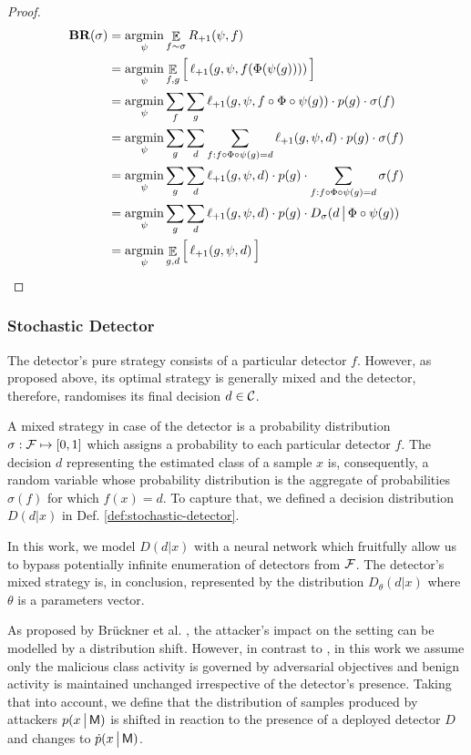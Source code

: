 \begin{proof}
    \begin{align}
        \textbf{BR}(\sigma) &= \mathop{\text{argmin}}_\psi \mathop{\mathbb{E}}_{f \sim \sigma} R_{{\text{+}1}}(\psi, f) \\
            &= \mathop{\text{argmin}}_\psi \mathop{\mathbb{E}}_{f, g} \Big[\, \ell_{{\text{+}1}} (g, \psi, f(\Phi(\psi(g)))) \,\Big] \\
            &= \mathop{\text{argmin}}_\psi \sum_f \sum_g  \ell_{{\text{+}1}} (g, \psi, f \circ \Phi \circ \psi(g))  \cdot  p(g) \cdot  \sigma(f)  \\
            &= \mathop{\text{argmin}}_\psi \sum_g \sum_d \sum_{f: f \circ \Phi \circ \psi(g) = d}  \ell_{{\text{+}1}} (g, \psi, d) \cdot  p(g) \cdot \sigma(f) \\
            &= \mathop{\text{argmin}}_\psi \sum_g \sum_d \ell_{{\text{+}1}} (g, \psi, d)  \cdot   p(g)  \cdot  \sum_{f: f \circ \Phi \circ \psi(g) = d} \sigma(f) \\
            &= \mathop{\text{argmin}}_\psi \sum_g \sum_d \ell_{{\text{+}1}} (g, \psi, d) \cdot  p(g)  \cdot D_\sigma(d \,\big|\, \Phi \circ \psi(g) ) \\
            &= \mathop{\text{argmin}}_\psi \mathop{\mathbb{E}}_{g,d} \Big[\, \ell_{{\text{+}1}} (g, \psi, d) \,\Big]
    \end{align}
\end{proof}

\subsubsection{Stochastic Detector}\label{sec:stochastic_detector}
The detector's pure strategy consists of a particular detector $f$. However, as proposed above, its optimal strategy is generally mixed and the detector, therefore, randomises its final decision $d \in \mathcal{C}$.

A mixed strategy in case of the detector is a probability distribution $\sigma : \mathcal{F} \mapsto [0,1]$ which assigns a probability to each particular detector $f$. The decision $d$ representing the estimated class of a sample $x$ is, consequently, a random variable whose probability distribution is the aggregate of probabilities $\sigma(f)$ for which $f(x) = d$. To capture that, we defined a decision distribution $D(d|x)$ in Def. \ref{def:stochastic-detector}.

In this work, we model $D(d|x)$ with a neural network which fruitfully allow us to bypass potentially infinite enumeration of detectors from $\mathcal{F}$. The detector's mixed strategy is, in conclusion, represented by the distribution $D_\theta (d|x)$ where $\theta$ is a parameters vector.

As proposed by Brückner et al. \cite{stackelberg_games}, the attacker's impact on the setting can be modelled by a distribution shift. However, in contrast to \cite{stackelberg_games}, in this work we assume only the malicious class activity is governed by adversarial objectives and benign activity is maintained unchanged irrespective of the detector's presence. Taking that into account, we define that the distribution of samples produced by attackers $p(x \,\big|\, \mathsf{M})$ is shifted in reaction to the presence of a deployed detector $D$ and changes to $\dot{p}(x \,\big|\, \mathsf{M})$.

